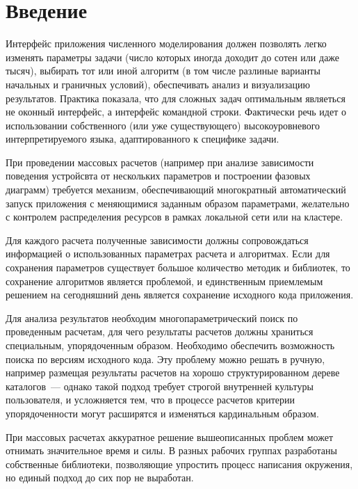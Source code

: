 \section{Введение}

Интерфейс приложения численного моделирования должен позволять
легко изменять параметры задачи (число которых иногда доходит до сотен или даже тысяч),
выбирать тот или иной алгоритм (в том числе разлиные варианты начальных и граничных условий),
обеспечивать анализ и визуализацию
результатов. Практика показала, что для сложных задач оптимальным
являеться не оконный интерфейс, а интерфейс командной
строки. Фактически речь идет о использовании собственного (или уже
существующего) высокоуровневого интерпретируемого языка,
адаптированного к специфике задачи.

При проведении массовых расчетов (например при анализе зависимости поведения устройсвта от 
нескольких параметров и построении фазовых диаграмм) требуется механизм, обеспечивающий
многократный автоматический запуск приложения с меняющимися заданным образом параметрами, 
желательно с контролем распределения ресурсов в рамках локальной сети или на кластере.

Для каждого расчета полученные зависимости должны сопровождаться
информацией о использованных параметрах расчета и алгоритмах. Если для
сохранения параметров существует большое количество методик и
библиотек, то сохранение алгоритмов является проблемой, и единственным
приемлемым решением на сегодняшний день является сохранение исходного
кода приложения.

Для анализа результатов необходим многопараметрический поиск по
проведенным расчетам, для чего результаты расчетов должны храниться
специальным, упорядоченным образом. Необходимо обеспечить возможность
поиска по версиям исходного кода. Эту проблему можно решать в ручную,
например размещая результаты расчетов на хорошо структурированном дереве
каталогов~--- однако такой подход требует строгой внутренней культуры пользователя, и
усложняется тем, что в процессе расчетов критерии упорядоченности могут
расширятся и изменяться кардинальным образом.   

При массовых расчетах аккуратное решение вышеописанных проблем может отнимать значительное время и силы. 
В разных рабочих группах
разработаны собственные библиотеки, позволяющие упростить процесс
написания окружения, но единый подход до сих пор не выработан.

